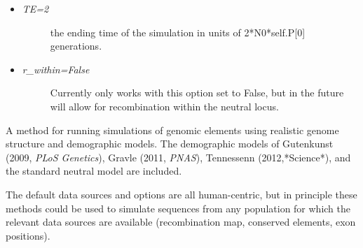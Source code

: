 \documentclass[letterpaper,10pt,english]{sphinxmanual}
\begin{document}
\begin{fulllineitems}
\begin{fulllineitems}
\begin{itemize}
\begin{itemize}
\begin{description}
\end{description}

\item {} \begin{description}
\item[{\emph{TE=2}}] \leavevmode
the ending time of the simulation in units of 
2*N0*self.P{[}0{]} generations.

\end{description}

\item {} \begin{description}
\item[{\emph{r\_within=False}}] \leavevmode
Currently only works with this option set to False, 
but in the future will allow for recombination within the 
neutral locus.

\end{description}

\end{itemize}

\end{itemize}

\end{fulllineitems}


\begin{fulllineitems}
\label{index:command.SFSCommand.genomic}
A method for running simulations of genomic elements using realistic
genome structure and demographic models.  The demographic models of 
Gutenkunst (2009, \emph{PLoS Genetics}), Gravle (2011, \emph{PNAS}), Tennessenn
(2012,*Science*), and the standard neutral model are included.

The default data sources and options are all
human-centric, but in principle these methods could be used to simulate
sequences from any population for which the relevant data sources are 
available (recombination map, conserved elements, exon positions).


\end{fulllineitems}
\end{fulllineitems}
\end{document}

